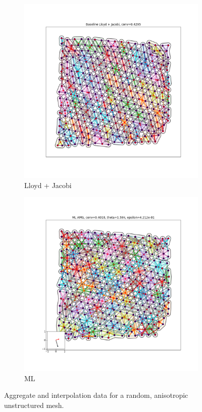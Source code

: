 \documentclass{article}
\begin{document}
\begin{figure}[h]
  \centering
  \begin{subfigure}[t]{0.49\textwidth}
    \centering
    \includegraphics[width=\textwidth, trim=80 70 70 50, clip]{anis_grid_5_lloyd.pdf}
    \caption{Lloyd + Jacobi}
  \end{subfigure}
  \begin{subfigure}[t]{0.49\textwidth}
    \centering
    \includegraphics[width=\textwidth, trim=80 70 70 50, clip]{anis_grid_5_ml.pdf}
    \caption{ML}
  \end{subfigure}
  \caption{Aggregate and interpolation data for a random, anisotropic unstructured mesh.}
  \label{fig:anis_grid_5}
\end{figure}
\end{document}
